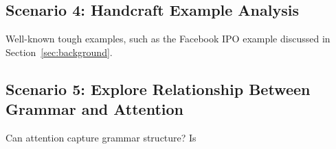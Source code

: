 \subsection{Scenario 4: Handcraft Example Analysis}
Well-known tough examples, such as the Facebook IPO example discussed in Section~\ref{sec:background}.

\subsection{Scenario 5: Explore Relationship Between Grammar and Attention}
Can attention capture grammar structure? Is 
